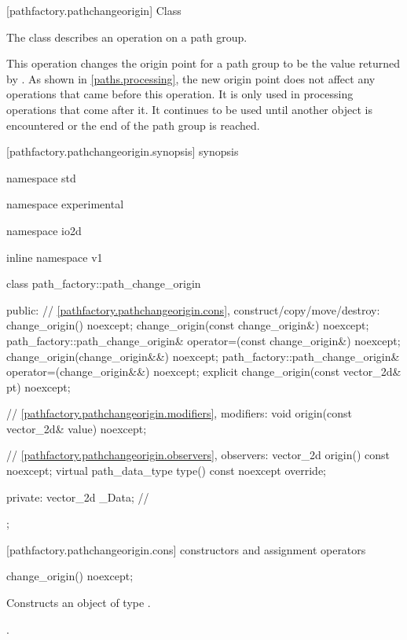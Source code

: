  [pathfactory.pathchangeorigin] {Class }

\pnum
{}
The class  describes an operation on a path group.

\pnum
This operation changes the origin point for a path group to be the value returned by . As shown in \ref{paths.processing}, the new origin point does not affect any operations that came before this operation. It is only used in processing operations that come after it. It continues to be used until another  object is encountered or the end of the path group is reached.

 [pathfactory.pathchangeorigin.synopsis] { synopsis}

\begin{codeblock}
namespace std { namespace experimental { namespace io2d { inline namespace v1 {
  class path_factory::path_change_origin {
  public:
    // \ref{pathfactory.pathchangeorigin.cons}, construct/copy/move/destroy:
    change_origin() noexcept;
    change_origin(const change_origin&) noexcept;
    path_factory::path_change_origin& operator=(const change_origin&) noexcept;
    change_origin(change_origin&&) noexcept;
    path_factory::path_change_origin& operator=(change_origin&&) noexcept;
    explicit change_origin(const vector_2d& pt) noexcept;

    // \ref{pathfactory.pathchangeorigin.modifiers}, modifiers:
    void origin(const vector_2d& value) noexcept;

    // \ref{pathfactory.pathchangeorigin.observers}, observers:
    vector_2d origin() const noexcept;
    virtual path_data_type type() const noexcept override;
    
  private:
    vector_2d _Data; // \expos
  };
} } } }
\end{codeblock}

 [pathfactory.pathchangeorigin.cons] { constructors and assignment operators}

\begin{itemdecl}
    change_origin() noexcept;
\end{itemdecl}
\begin{itemdescr}
	\pnum
	\effects
	Constructs an object of type .
	
	\pnum
	\postconditions
	.
\end{itemdescr}

